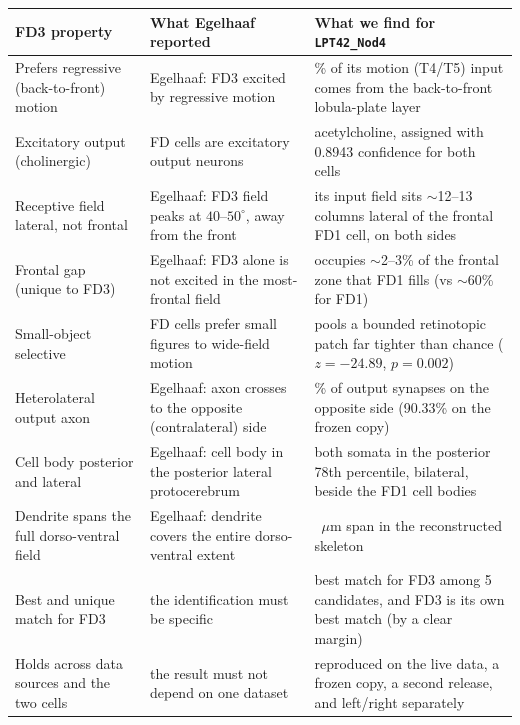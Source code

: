 \documentclass[11pt]{article}
\newcommand{\ttt}[1]{\texttt{#1}}
\begin{document}
\begin{table}[H]\centering\footnotesize\caption{Each defining property of Egelhaaf's FD3 cell and the matching measurement for the FlyWire cell type \ttt{LPT42\_Nod4}.}\label{tab:evidence}

\renewcommand{\arraystretch}{1.3}
\begin{longtable}{>{\raggedright\arraybackslash}p{} >{\raggedright\arraybackslash}p{} >{\raggedright\arraybackslash}p{}}
\toprule \textbf{FD3 property} & \textbf{What Egelhaaf reported} & \textbf{What we find for \ttt{LPT42\_Nod4}} \\\midrule\endhead
Prefers regressive (back-to-front) motion & Egelhaaf: FD3 excited by regressive motion & 98.36\% of its motion (T4/T5) input comes from the back-to-front lobula-plate layer \\
Excitatory output (cholinergic) & FD cells are excitatory output neurons & acetylcholine, assigned with 0.8943 confidence for both cells \\
Receptive field lateral, not frontal & Egelhaaf: FD3 field peaks at $40$--$50^\circ$, away from the front & its input field sits $\sim$12--13 columns lateral of the frontal FD1 cell, on both sides \\
Frontal gap (unique to FD3) & Egelhaaf: FD3 alone is not excited in the most-frontal field & occupies $\sim$2--3\% of the frontal zone that FD1 fills (vs $\sim$60\% for FD1) \\
Small-object selective & FD cells prefer small figures to wide-field motion & pools a bounded retinotopic patch far tighter than chance ($z=-24.89$, $p=0.002$) \\
Heterolateral output axon & Egelhaaf: axon crosses to the opposite (contralateral) side & 80.47\% of output synapses on the opposite side (90.33\% on the frozen copy) \\
Cell body posterior and lateral & Egelhaaf: cell body in the posterior lateral protocerebrum & both somata in the posterior 78th percentile, bilateral, beside the FD1 cell bodies \\
Dendrite spans the full dorso-ventral field & Egelhaaf: dendrite covers the entire dorso-ventral extent & 155.0~$\mu$m span in the reconstructed skeleton \\
Best and unique match for FD3 & the identification must be specific & best match for FD3 among 5 candidates, and FD3 is its own best match (by a clear margin) \\
Holds across data sources and the two cells & the result must not depend on one dataset & reproduced on the live data, a frozen copy, a second release, and left/right separately \\
\bottomrule\end{longtable}
\renewcommand{\arraystretch}{1.0}

\end{table}
\end{document}
